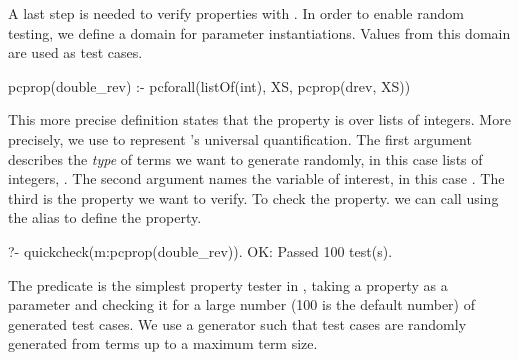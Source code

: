 A last step is needed %
to verify properties with \plqc{}.
%
In order to enable random testing, we
define a domain for parameter instantiations.
Values from this domain are used as test cases.
%
\begin{yapcode}
 pcprop(double_rev) :- pcforall(listOf(int), XS, pcprop({drev, XS}))
\end{yapcode}
%


This more precise definition %
states that the property  is 
over lists of integers.%
%
More precisely, we use  to represent \plqc{}'s universal quantification.
%
The first argument describes the \emph{type} of terms we want to
generate randomly, in this case lists of integers,
.
%
The second argument names the variable of interest, in this case .
%
The third %
is
the property we want to verify.
%
%
To
check the property.
%
we can call
 \plqc{} using the alias
 to define the property.
\begin{yapcode}
   ?- quickcheck(m:pcprop(double_rev)).
 OK: Passed 100 test(s).
\end{yapcode}
%
The  predicate is the simplest property tester in
\plqc{}, taking a property as a parameter and checking it for a large
number (100 is the default number) of generated test cases.
%
We use a generator such that test cases are randomly generated from
terms up to a maximum term size.

